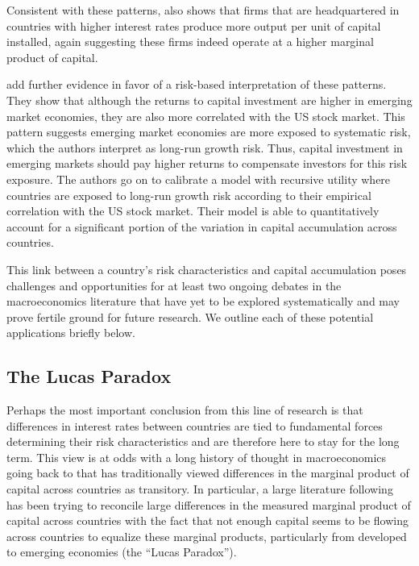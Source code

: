\documentclass{ar-1col}
\begin{document}
Consistent with these patterns, \citet{Richers2020} also shows that firms that are headquartered in countries with higher interest rates produce more output per unit of capital installed, again suggesting these firms indeed operate at a higher marginal product of capital.

\citet{DavidHenriksenSimonovska2014} add further evidence in favor of a risk-based interpretation of these patterns. They show that although the returns to capital investment are higher in emerging market economies, they are also more correlated with the US stock market. This pattern suggests emerging market economies are more exposed to systematic risk, which the authors interpret as long-run growth risk. Thus, capital investment in emerging markets should pay higher returns to compensate investors for this risk exposure. The authors go on to calibrate a model with recursive utility where countries are exposed to long-run growth risk according to their empirical correlation with the US stock market. Their model is able to quantitatively account for a significant portion of the variation in capital accumulation across countries.

This link between a country's risk characteristics and capital accumulation poses challenges and opportunities for at least two ongoing debates in the macroeconomics literature that have yet to be explored systematically and may prove fertile ground for future research. We outline each of these potential applications briefly below.

\subsection{The Lucas Paradox}

Perhaps the most important conclusion from this line of research is that differences in interest rates between countries are tied to fundamental forces determining their risk characteristics and are therefore here to stay for the long term. This view is at odds with a long history of thought in macroeconomics going back to \cite{solow1956contribution} that has traditionally viewed differences in the marginal product of capital across countries as transitory. In particular, a large literature following \citet{Lucas1990} has been trying to reconcile large differences in the measured marginal product of capital across countries with the fact that not enough capital seems to be flowing across countries to equalize these marginal products, particularly from developed to emerging economies (the ``Lucas Paradox''). 
\end{document}
